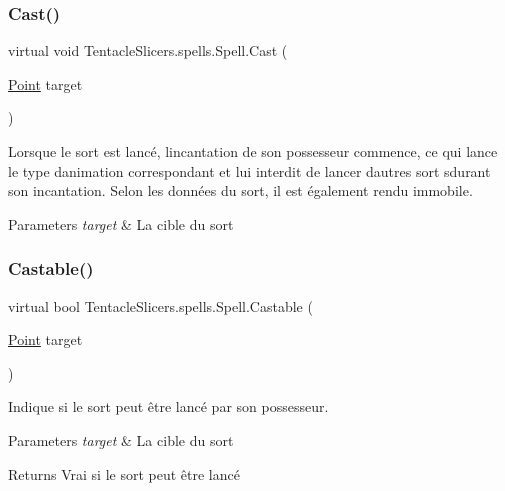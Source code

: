 \subsubsection{\texorpdfstring{Cast()}{Cast()}}
{\footnotesize\ttfamily virtual void Tentacle\+Slicers.\+spells.\+Spell.\+Cast (\begin{DoxyParamCaption}\item[{\hyperlink{class_tentacle_slicers_1_1general_1_1_point}{Point}}]{target }\end{DoxyParamCaption})\hspace{0.3cm}{\ttfamily [virtual]}}



Lorsque le sort est lancé, l\textquotesingle{}incantation de son possesseur commence, ce qui lance le type d\textquotesingle{}animation correspondant et lui interdit de lancer d\textquotesingle{}autres sort sdurant son incantation. Selon les données du sort, il est également rendu immobile. 


\begin{DoxyParams}{Parameters}
{\em target} & La cible du sort \\
\hline
\end{DoxyParams}
\mbox{\label{class_tentacle_slicers_1_1spells_1_1_spell_ae1c14da219bcc85510459df0bbb8daa0}} 
\subsubsection{\texorpdfstring{Castable()}{Castable()}}
{\footnotesize\ttfamily virtual bool Tentacle\+Slicers.\+spells.\+Spell.\+Castable (\begin{DoxyParamCaption}\item[{\hyperlink{class_tentacle_slicers_1_1general_1_1_point}{Point}}]{target }\end{DoxyParamCaption})\hspace{0.3cm}{\ttfamily [virtual]}}



Indique si le sort peut être lancé par son possesseur. 


\begin{DoxyParams}{Parameters}
{\em target} & La cible du sort \\
\hline
\end{DoxyParams}
\begin{DoxyReturn}{Returns}
Vrai si le sort peut être lancé 
\end{DoxyReturn}
\mbox{\label{class_tentacle_slicers_1_1spells_1_1_spell_a85ff8039a270ba8dea0024beb6030ca8}} 
